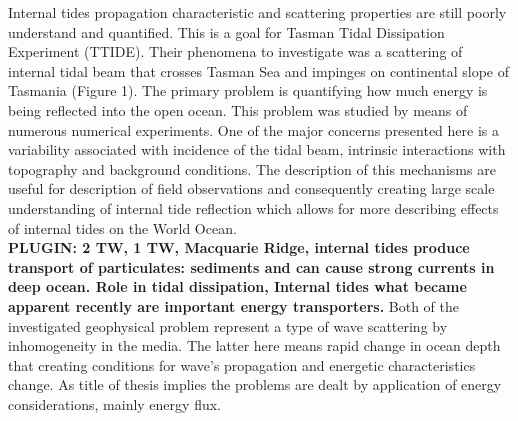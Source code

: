 Internal tides propagation characteristic and scattering properties are still poorly understand and quantified. This is a goal for Tasman Tidal Dissipation Experiment (TTIDE). Their phenomena to investigate was a scattering of internal tidal beam that crosses Tasman Sea and impinges on continental slope of Tasmania (Figure 1). The primary problem is quantifying how much energy is being reflected into the open ocean. This problem was studied by means of numerous numerical experiments. One of the major concerns presented here is a variability associated with incidence of the tidal beam, intrinsic interactions with topography and background conditions. The description of this mechanisms are useful for description of field observations and consequently creating large scale understanding of internal tide reflection which allows for more describing effects of internal tides on the World Ocean.\\
\textbf{PLUGIN: 2 TW, 1 TW, Macquarie Ridge, internal tides produce transport of particulates: sediments and can cause strong currents in deep ocean. Role in tidal dissipation, Internal tides what became apparent recently are important energy transporters.}
Both of the investigated geophysical problem represent a type of wave scattering by inhomogeneity in the media. The latter here means rapid change in ocean depth that creating conditions for wave's propagation and energetic characteristics change. As title of thesis implies the problems are dealt by application of energy considerations, mainly energy flux.

